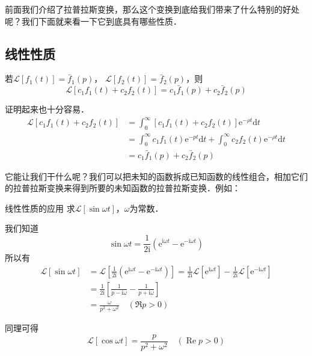 

前面我们介绍了拉普拉斯变换，那么这个变换到底给我们带来了什么特别的好处呢？我们下面就来看一下它到底具有哪些性质．

\subsection{线性性质}


若$\mathscr L[f_1(t)] = \bar f_1(p)$， $\mathscr L[f_2(t)] = \bar f_2(p)$，则
\begin{equation}
\mathscr L[c_1f_1(t)+c_2f_2(t)] = c_1\bar f_1(p) + c_2\bar f_2(p)
\end{equation}

证明起来也十分容易．
\begin{equation}
\begin{aligned} \mathscr L[c_{1} f_{1}(t)+c_{2} f_{2}(t)] & = \int_{0}^{\infty}\left[c_{1} f_{1}(t)+c_{2} f_{2}(t)\right] \mathrm{e}^{-\rho t} \mathrm{d} t \\ &=\int_{0}^{\infty} c_{1} f_{1}(t) \mathrm{e}^{-p t} \mathrm{d} t+\int_{0}^{\infty} c_{2} f_{2}(t) \mathrm{e}^{-\rho t} \mathrm{d} t \\ &=c_{1} \bar{f}_{1}(p)+c_{2} \bar{f}_{2}(p) \end{aligned}
\end{equation}

它能让我们干什么呢？我们可以把未知的函数拆成已知函数的线性组合，相加它们的拉普拉斯变换来得到所要的未知函数的拉普拉斯变换．例如：
\begin{example}{线性性质的应用}
求$\mathscr L[\sin \omega t]$，$\omega$为常数．

我们知道
\begin{equation}
\sin \omega t=\frac{1}{2 \mathrm{i}}\left(\mathrm{e}^{\mathrm{i} \omega t}-\mathrm{e}^{-\mathrm{i} \omega t}\right)
\end{equation}
所以有
\begin{equation}
\begin{aligned} \mathscr{L}[\sin \omega t] &=\mathscr{L}\left[\frac{1}{2 \mathrm{i}}\left(\mathrm{e}^{\mathrm{i} \omega t}-\mathrm{e}^{-\mathrm{i} \omega t}\right)\right]=\frac{1}{2 \mathrm{i}} \mathscr{L}\left[\mathrm{e}^{\mathrm{i} \omega t}\right]-\frac{1}{2 \mathrm{i}}\mathscr{L}\left[\mathrm{e}^{-\mathrm{i} \omega t}\right] \\ &=\frac{1}{2 \mathrm{i}}\left[\frac{1}{p-\mathrm{i} \omega}-\frac{1}{p+\mathrm{i} \omega}\right] \\ &=\frac{\omega}{p^{2}+\omega^{2}} \quad(\Re p>0) \end{aligned}
\end{equation}

同理可得
\begin{equation}
\mathscr{L}[\cos \omega t]=\frac{p}{p^{2}+\omega^{2}} \quad(\operatorname{Re} p>0)
\end{equation}
\end{example}


